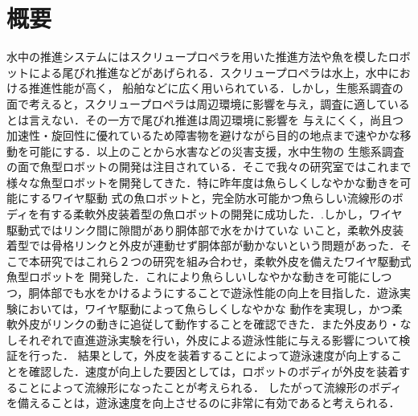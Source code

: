 \newpage
\section*{概要}
水中の推進システムにはスクリュープロペラを用いた推進方法や魚を模したロボットによる尾びれ推進などがあげられる．スクリュープロペラは水上，水中における推進性能が高く，
船舶などに広く用いられている．しかし，生態系調査の面で考えると，スクリュープロペラは周辺環境に影響を与え，調査に適しているとは言えない．その一方で尾びれ推進は周辺環境に影響を
与えにくく，尚且つ加速性・旋回性に優れているため障害物を避けながら目的の地点まで速やかな移動を可能にする．以上のことから水害などの災害支援，水中生物の
生態系調査の面で魚型ロボットの開発は注目されている．そこで我々の研究室ではこれまで様々な魚型ロボットを開発してきた．特に昨年度は魚らしくしなやかな動きを可能にするワイヤ駆動
式の魚ロボットと，完全防水可能かつ魚らしい流線形のボディを有する柔軟外皮装着型の魚ロボットの開発に成功した．.しかし，ワイヤ駆動式ではリンク間に隙間があり胴体部で水をかけていな
いこと，柔軟外皮装着型では骨格リンクと外皮が連動せず胴体部が動かないという問題があった．そこで本研究ではこれら２つの研究を組み合わせ，柔軟外皮を備えたワイヤ駆動式魚型ロボットを
開発した．これにより魚らしいしなやかな動きを可能にしつつ，胴体部でも水をかけるようにすることで遊泳性能の向上を目指した．遊泳実験においては，ワイヤ駆動によって魚らしくしなやかな
動作を実現し，かつ柔軟外皮がリンクの動きに追従して動作することを確認できた．また外皮あり・なしそれぞれで直進遊泳実験を行い，外皮による遊泳性能に与える影響について検証を行った．
結果として，外皮を装着することによって遊泳速度が向上することを確認した．速度が向上した要因としては，ロボットのボディが外皮を装着することによって流線形になったことが考えられる．
したがって流線形のボディを備えることは，遊泳速度を向上させるのに非常に有効であると考えられる．
